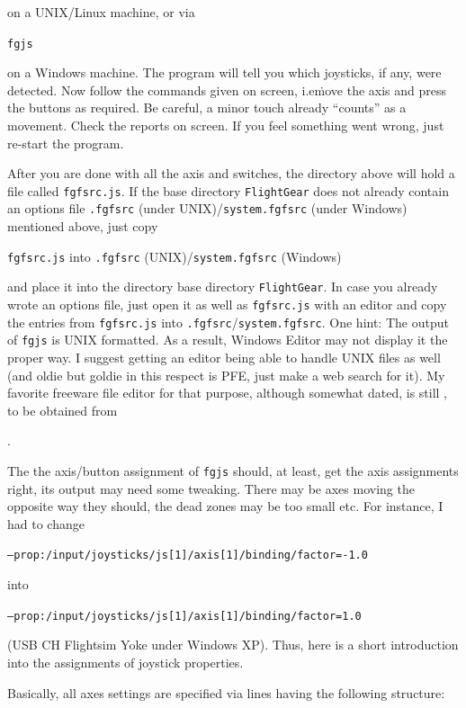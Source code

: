 on a UNIX/Linux machine, or via

\noindent
\texttt{fgjs}

on a Windows machine. The program will tell you which joysticks, if any, were detected. Now follow the commands given on screen, i.e\. move the axis and press the buttons as required. Be careful, a minor touch already ``counts'' as a movement. Check the reports on screen. If you feel something went wrong, just re-start the program.

After you are done with all the axis and switches, the directory above will hold a file called \texttt{fgfsrc.js}. If the \FlightGear{} base directory \texttt{FlightGear} does not already contain an options file \texttt{.fgfsrc} (under UNIX)/\texttt{system.fgfsrc} (under Windows) mentioned above, just copy
\medskip

\noindent
 \texttt{fgfsrc.js} into \texttt{.fgfsrc} (UNIX)/\texttt{system.fgfsrc} (Windows) 
 \medskip

\noindent 
and place it into the directory \FlightGear{} base directory \texttt{FlightGear}. In case you already wrote an options file, just open it as well as \texttt{fgfsrc.js} with an editor and copy the entries from \texttt{fgfsrc.js} into \texttt{.fgfsrc}/\texttt{system.fgfsrc}. One hint: The output of \texttt{fgjs} is UNIX formatted. As a result, Windows Editor may not display it the proper way. I suggest getting an editor being able to handle UNIX files as well (and oldie but goldie in this respect is PFE, just make a web search for it). My favorite freeware file editor for that purpose, although somewhat dated, is still , to be obtained from

.

The the axis/button assignment of \texttt{fgjs} should, at least, get the axis assignments right, its output may need some tweaking. There may be axes moving the opposite way they should, the dead zones may be too small etc. For instance, I had to change 

\texttt{--prop:/input/joysticks/js[1]/axis[1]/binding/factor=-1.0}

into

\texttt{--prop:/input/joysticks/js[1]/axis[1]/binding/factor=1.0}

(USB CH Flightsim Yoke under Windows XP). Thus, here is a short introduction into the assignments of joystick properties.

Basically, all axes settings are specified via lines having the following structure:
 \medskip

